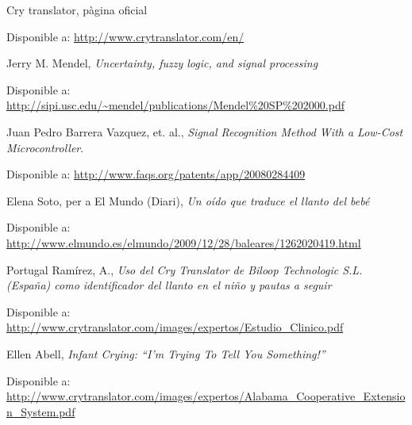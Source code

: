 \documentclass[11pt,a4paper]{article}
\begin{document}
\clearpage
\begin{thebibliography}{1}

 Cry translator, pàgina oficial

Disponible a: \url{http://www.crytranslator.com/en/}

 Jerry M. Mendel, \emph{Uncertainty, fuzzy logic, and signal processing}

Disponible a: \url{http://sipi.usc.edu/~mendel/publications/Mendel%20SP%202000.pdf}

 Juan Pedro Barrera Vazquez, et. al., \emph{Signal Recognition Method With a Low-Cost Microcontroller}. 

Disponible a: \url{http://www.faqs.org/patents/app/20080284409}

 Elena Soto, per a El Mundo (Diari), \emph{Un oído que traduce el llanto del bebé}

Disponible a: \url{http://www.elmundo.es/elmundo/2009/12/28/baleares/1262020419.html}

 Portugal Ramírez, A., \emph{Uso del Cry Translator de Biloop Technologic S.L. (España) como identificador del llanto en el niño y pautas a seguir }

Disponible a: \url{http://www.crytranslator.com/images/expertos/Estudio\_Clinico.pdf}

 Ellen Abell, \emph{Infant Crying: ``I’m Trying To Tell You Something!''}

Disponible a: \url{http://www.crytranslator.com/images/expertos/Alabama\_Cooperative\_Extension\_System.pdf}
\end{thebibliography}
\end{document}
